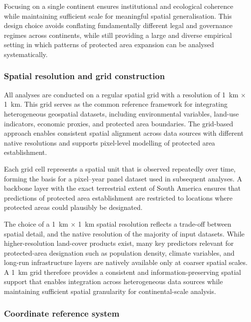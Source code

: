 \documentclass[12pt]{article}
\theoremstyle{break} %
\begin{document}
Focusing on a single continent ensures institutional and ecological coherence while maintaining sufficient scale for meaningful spatial generalisation. This design choice avoids conflating fundamentally different legal and governance regimes across continents, while still providing a large and diverse empirical setting in which patterns of protected area expansion can be analysed systematically.

\subsubsection{Spatial resolution and grid construction} \label{Spatial resolution and grid construction}

All analyses are conducted on a regular spatial grid with a resolution of 1~km $\times$ 1~km. This grid serves as the common reference framework for integrating heterogeneous geospatial datasets, including environmental variables, land-use indicators, economic proxies, and protected area boundaries. The grid-based approach enables consistent spatial alignment across data sources with different native resolutions and supports pixel-level modelling of protected area establishment.

Each grid cell represents a spatial unit that is observed repeatedly over time, forming the basis for a pixel--year panel dataset used in subsequent analyses. A backbone layer with the exact terrestrial extent of South America ensures that predictions of protected area establishment are restricted to locations where protected areas could plausibly be designated.

The choice of a 1~km $\times$ 1~km spatial resolution reflects a trade-off between spatial detail, and the native resolution of the majority of input datasets. While higher-resolution land-cover products exist, many key predictors relevant for protected-area designation such as population density, climate variables, and long-run infrastructure layers are natively available only at coarser spatial scales. A 1~km grid therefore provides a consistent and information-preserving spatial support that enables integration across heterogeneous data sources while maintaining sufficient spatial granularity for continental-scale analysis.

\subsubsection{Coordinate reference system} \label{Coordinate reference system}
\end{document}
